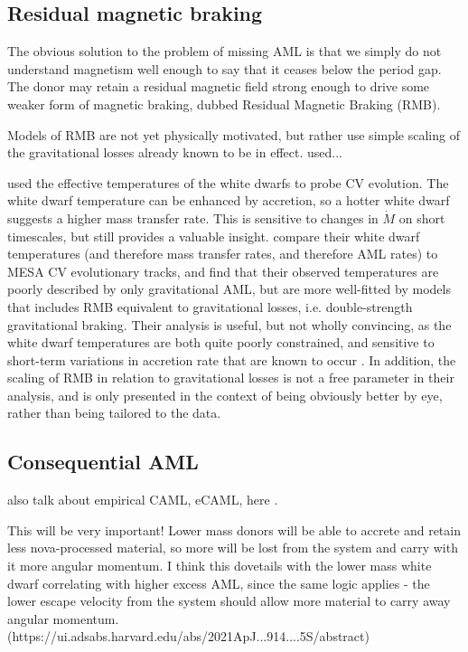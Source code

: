 \subsection{Residual magnetic braking}

The obvious solution to the problem of missing AML is that we simply do not understand magnetism well enough to say that it ceases below the period gap. The donor may retain a residual magnetic field strong enough to drive some weaker form of magnetic braking, dubbed Residual Magnetic Braking (RMB). 

Models of RMB are not yet physically motivated, but rather use simple scaling of the gravitational losses already known to be in effect. \citet{knige11} used...

\citet{Pala2017a} used the effective temperatures of the white dwarfs to probe CV evolution. The white dwarf temperature can be enhanced by accretion, so a hotter white dwarf suggests a higher mass transfer rate. This is sensitive to changes in $\dot M$ on short timescales, but still provides a valuable insight. \citet{Pala2017a} compare their white dwarf temperatures (and therefore mass transfer rates, and therefore AML rates) to MESA CV evolutionary tracks, and find that their observed temperatures are poorly described by only gravitational AML, but are more well-fitted by models that includes RMB equivalent to gravitational losses, i.e. double-strength gravitational braking. Their analysis is useful, but not wholly convincing, as the white dwarf temperatures are both quite poorly constrained, and sensitive to short-term variations in accretion rate that are known to occur . In addition, the scaling of RMB in relation to gravitational losses is not a free parameter in their analysis, and is only presented in the context of being obviously better by eye, rather than being tailored to the data.


\subsection{Consequential AML}
\label{sect:introduction:CAML}
also talk about empirical CAML, eCAML, here \citep{Schreiber2016}.

This will be very important! Lower mass donors will be able to accrete and retain less nova-processed material, so more will be lost from the system and carry with it more angular momentum. 
I think this dovetails with the lower mass white dwarf correlating with higher excess AML, since the same logic applies - the lower escape velocity from the system should allow more material to carry away angular momentum.
(https://ui.adsabs.harvard.edu/abs/2021ApJ...914....5S/abstract)

